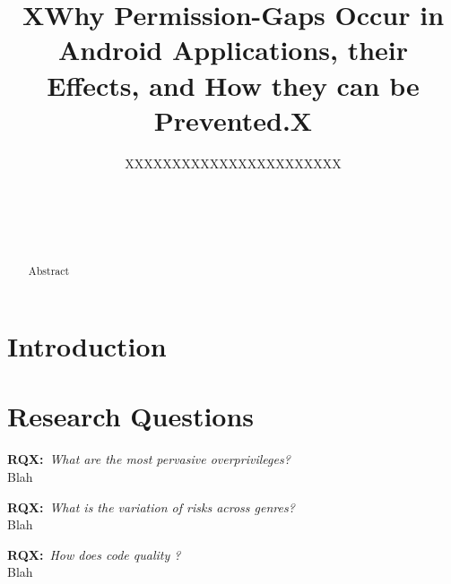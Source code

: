 \documentclass{sig-alternate}
\begin{document}
\title{XWhy Permission-Gaps Occur in Android Applications, their Effects, and How they can be Prevented.X}


\author{
%
\alignauthor
XXXXXXXXXXXXXXXXXXXXXXX\\ 	
	\\
       \\
       \\
        \\
}
\maketitle



\begin{abstract}
Abstract






\end{abstract}



\section{Introduction}






\section{Research Questions}
\label{sec: researchquestions}


\textbf{RQX:}~\emph{What are the most pervasive overprivileges?}\\
Blah


\textbf{RQX:}~\emph{What is the variation of risks across genres?}\\
Blah


\textbf{RQX:}~\emph{How does code quality ?}\\
Blah
\end{document}
